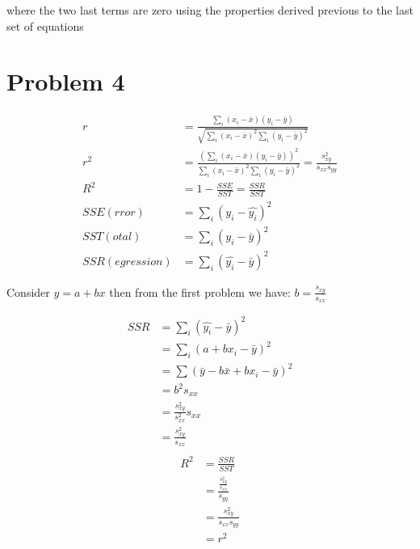 \documentclass[a4paper]{article}
\begin{document}
where the two last terms are zero using the properties derived previous to the last set of equations

\section*{Problem 4}
\begin{align*}
r &= \frac{\sum_i(x_i-\bar{x})(y_i-\bar{y})}{\sqrt{\sum_i(x_i-\bar{x})^2\sum_i(y_i-\bar{y})^2 }}\\
r^2 &= \frac{(\sum_i(x_i-\bar{x})(y_i-\bar{y}))^2}{{\sum_i(x_i-\bar{x})^2\sum_i(y_i-\bar{y})^2 }} = \frac{s_{xy}^2}{s_{xx}s_{yy}}\\
R^2 &= 1- \frac{SSE}{SST} = \frac{SSR}{SST}\\
SSE(rror) &= \sum_i(y_i-\hat{y_i})^2\\
SST(otal) &= \sum_i(y_i-\bar{y})^2\\
SSR(egression) &= \sum_i(\hat{y_i}-\bar{y})^2
\end{align*}

Consider $y=a+bx$ then from the first problem we have:
$b = \frac{s_{xy}}{s_{xx}}$

\begin{align*}
SSR &= \sum_i(\hat{y_i}-\bar{y})^2\\
&= \sum_i(a+bx_i-\bar{y})^2\\
&= \sum(\bar{y}-b\bar{x}+bx_i-\bar{y})^2\\
&= b^2s_{xx}\\
&= \frac{s_{xy}^2}{s_{xx}^2}s_{xx}\\
&= \frac{s_{xy}^2}{s_{xx}}\\
\end{align*}
\begin{align*}
R^2 &= \frac{SSR}{SST}\\
&= \frac{\frac{s_{xy}^2}{s_{xx}}}{s_{yy}}\\
&= \frac{s_{xy}^2}{s_{xx}s_{yy}}\\
&=r^2
\end{align*}
\end{document}
